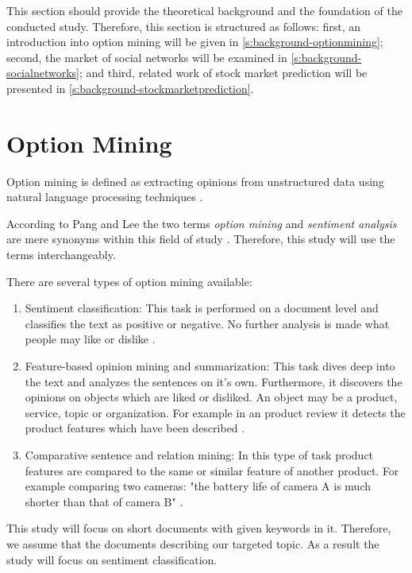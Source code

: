 This section should provide the theoretical background and the foundation of the conducted study.
Therefore, this section is structured as follows: 
first, an introduction into option mining will be given in \autoref{s:background-optionmining};
second, the market of social networks will be examined in \autoref{s:background-socialnetworks};
and third, related work of stock market prediction will be presented in \autoref{s:background-stockmarketprediction}.

\section{Option Mining} 
\label{s:background-optionmining}

Option mining is defined as extracting opinions from unstructured data using natural language processing techniques \cite[page 411]{Liu2007}.

According to Pang and Lee the two terms \emph{option mining} and \emph{sentiment analysis} are mere synonyms within this field of study \cite{Pang2008c}.
Therefore, this study will use the terms interchangeably.

There are several types of option mining available:

\begin{enumerate}
	\item 
	Sentiment classification: 
	This task is performed on a document level and classifies the text as positive or negative. 
	No further analysis is made what people may like or dislike 
	\cite[page 411]{Liu2007}.
	
	\item 
	Feature-based opinion mining and summarization: 
	This task dives deep into the text and analyzes the sentences on it's own.
	Furthermore, it discovers the opinions on objects which are liked or disliked.
	An object may be a product, service, topic or organization. 
	For example in an product review it detects the product features which have been described 
	\cite[page 412]{Liu2007}.
	
	\item
	Comparative sentence and relation mining:
	In this type of task product features are compared to the same or similar feature of another product.
	For example comparing two cameras: "the battery life of camera A is much shorter than that of camera B" 
	\cite[page 412]{Liu2007}. 
\end{enumerate}

This study will focus on short documents with given keywords in it. 
Therefore, we assume that the documents describing our targeted topic.
As a result the study will focus on sentiment classification.

